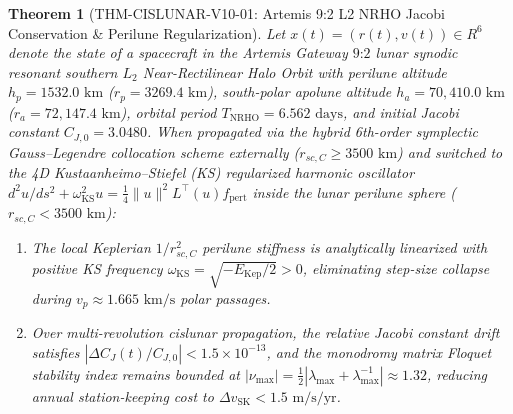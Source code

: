 \documentclass[11pt,a4paper,reqno]{article}
\def\bm#1{#1}%
\def\texttt#1{#1}%
\def\mathbb#1{#1}%
\theoremstyle{plain}
\newtheorem{theorem}{Theorem}[section]
\theoremstyle{definition}
\theoremstyle{remark}
\numberwithin{equation}{section}
\begin{document}
\begin{theorem}[\texttt{THM-CISLUNAR-V10-01}: Artemis 9:2 L2 NRHO Jacobi Conservation \& Perilune Regularization]
\label{thm:cislunar_nrho}
Let $\bm{x}(t) = (\bm{r}(t), \bm{v}(t)) \in \mathbb{R}^6$ denote the state of a spacecraft in the Artemis Gateway $9\text{:}2$ lunar synodic resonant southern $L_2$ Near-Rectilinear Halo Orbit with perilune altitude $h_p = 1532.0\text{ km}$ ($r_p = 3269.4\text{ km}$), south-polar apolune altitude $h_a = 70,410.0\text{ km}$ ($r_a = 72,147.4\text{ km}$), orbital period $T_{\text{NRHO}} = 6.562\text{ days}$, and initial Jacobi constant $C_{J,0} = 3.0480$. When propagated via the hybrid 6th-order symplectic Gauss--Legendre collocation scheme externally ($r_{sc,\mathbb{C}} \ge 3500\text{ km}$) and switched to the 4D Kustaanheimo--Stiefel (KS) regularized harmonic oscillator $d^2\bm{u}/ds^2 + \omega_{\text{KS}}^2 \bm{u} = \frac{1}{4}\|\bm{u}\|^2 \bm{L}^\top(\bm{u})\bm{f}_{\text{pert}}$ inside the lunar perilune sphere ($r_{sc,\mathbb{C}} < 3500\text{ km}$):
\begin{enumerate}[label=(\roman*),leftmargin=2.2em,itemsep=2pt]
  \item The local Keplerian $1/r_{sc,\mathbb{C}}^2$ perilune stiffness is analytically linearized with positive KS frequency $\omega_{\text{KS}} = \sqrt{-E_{\text{Kep}}/2} > 0$, eliminating step-size collapse during $v_p \approx 1.665\text{ km/s}$ polar passages.
  \item Over multi-revolution cislunar propagation, the relative Jacobi constant drift satisfies $|\Delta C_J(t) / C_{J,0}| < 1.5 \times 10^{-13}$, and the monodromy matrix Floquet stability index remains bounded at $|\nu_{\max}| = \frac{1}{2}|\lambda_{\max} + \lambda_{\max}^{-1}| \approx 1.32$, reducing annual station-keeping cost to $\Delta v_{\text{SK}} < 1.5\text{ m/s/yr}$.
\end{enumerate}
\end{theorem}
\end{document}
